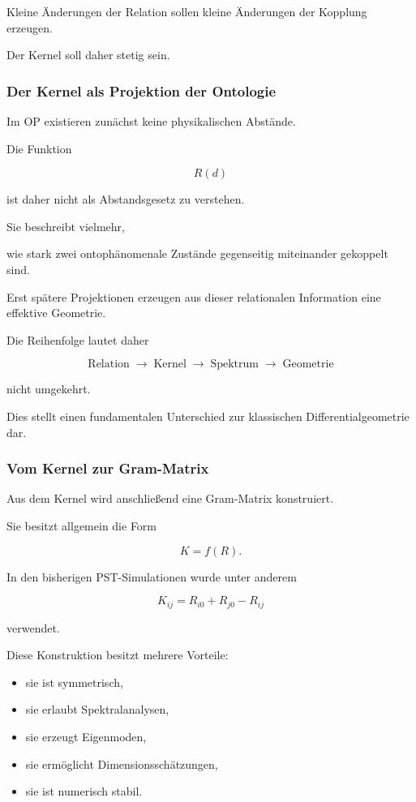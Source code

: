 Kleine Änderungen der Relation sollen kleine Änderungen
der Kopplung erzeugen.

Der Kernel soll daher stetig sein.

\bigskip

\subsubsection{Der Kernel als Projektion der Ontologie}

Im OP existieren zunächst keine physikalischen Abstände.

Die Funktion

\[
R(d)
\]

ist daher nicht als Abstandsgesetz zu verstehen.

Sie beschreibt vielmehr,

wie stark zwei ontophänomenale Zustände
gegenseitig miteinander gekoppelt sind.

Erst spätere Projektionen erzeugen aus dieser
relationalen Information eine effektive Geometrie.

Die Reihenfolge lautet daher

\[
\boxed{
\text{Relation}
\;\longrightarrow\;
\text{Kernel}
\;\longrightarrow\;
\text{Spektrum}
\;\longrightarrow\;
\text{Geometrie}
}
\]

nicht umgekehrt.

Dies stellt einen fundamentalen Unterschied
zur klassischen Differentialgeometrie dar.

\bigskip

\subsubsection{Vom Kernel zur Gram-Matrix}

Aus dem Kernel wird anschließend eine
Gram-Matrix konstruiert.

Sie besitzt allgemein die Form

\[
K=f(R).
\]

In den bisherigen PST-Simulationen wurde unter anderem

\[
K_{ij}
=
R_{i0}
+
R_{j0}
-
R_{ij}
\]

verwendet.

Diese Konstruktion besitzt mehrere Vorteile:

\begin{itemize}
\item sie ist symmetrisch,
\item sie erlaubt Spektralanalysen,
\item sie erzeugt Eigenmoden,
\item sie ermöglicht Dimensionsschätzungen,
\item sie ist numerisch stabil.
\end{itemize}

